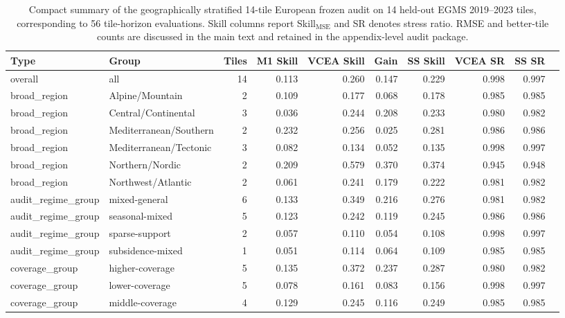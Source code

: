 \documentclass[lettersize,journal]{IEEEtran}
\begin{document}
\begin{table}[!t]
\centering
\scriptsize
\begin{adjustbox}{max width=\textwidth}
\begin{tabular}{llrrrrrrrr}
\toprule
Type & Group & Tiles & M1 Skill & VCEA Skill & Gain & SS Skill & VCEA SR & SS SR \\
\midrule
overall & all & 14 & 0.113 & 0.260 & 0.147 & 0.229 & 0.998 & 0.997 \\
broad\_region & Alpine/Mountain & 2 & 0.109 & 0.177 & 0.068 & 0.178 & 0.985 & 0.985 \\
broad\_region & Central/Continental & 3 & 0.036 & 0.244 & 0.208 & 0.233 & 0.980 & 0.982 \\
broad\_region & Mediterranean/Southern & 2 & 0.232 & 0.256 & 0.025 & 0.281 & 0.986 & 0.986 \\
broad\_region & Mediterranean/Tectonic & 3 & 0.082 & 0.134 & 0.052 & 0.135 & 0.998 & 0.997 \\
broad\_region & Northern/Nordic & 2 & 0.209 & 0.579 & 0.370 & 0.374 & 0.945 & 0.948 \\
broad\_region & Northwest/Atlantic & 2 & 0.061 & 0.241 & 0.179 & 0.222 & 0.981 & 0.982 \\
audit\_regime\_group & mixed-general & 6 & 0.133 & 0.349 & 0.216 & 0.276 & 0.981 & 0.982 \\
audit\_regime\_group & seasonal-mixed & 5 & 0.123 & 0.242 & 0.119 & 0.245 & 0.986 & 0.986 \\
audit\_regime\_group & sparse-support & 2 & 0.057 & 0.110 & 0.054 & 0.108 & 0.998 & 0.997 \\
audit\_regime\_group & subsidence-mixed & 1 & 0.051 & 0.114 & 0.064 & 0.109 & 0.985 & 0.985 \\
coverage\_group & higher-coverage & 5 & 0.135 & 0.372 & 0.237 & 0.287 & 0.980 & 0.982 \\
coverage\_group & lower-coverage & 5 & 0.078 & 0.161 & 0.083 & 0.156 & 0.998 & 0.997 \\
coverage\_group & middle-coverage & 4 & 0.129 & 0.245 & 0.116 & 0.249 & 0.985 & 0.985 \\
\bottomrule
\end{tabular}
\end{adjustbox}
\caption{Compact summary of the geographically stratified 14-tile European frozen audit on 14 held-out EGMS 2019--2023 tiles, corresponding to 56 tile-horizon evaluations. Skill columns report Skill$_{\mathrm{MSE}}$ and SR denotes stress ratio. RMSE and better-tile counts are discussed in the main text and retained in the appendix-level audit package.}
\label{tab:e7_strong_group_summary}
\end{table}
\end{document}
